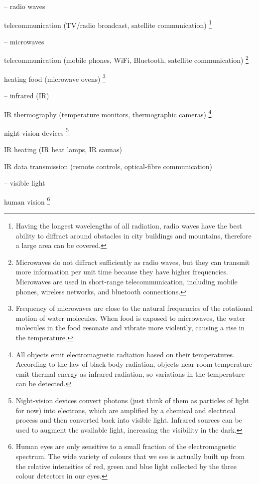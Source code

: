 \begin{compactitem}
	\item[--] radio waves
	
	\xskip telecommunication (TV/radio broadcast, satellite communication) \footnote{Having the longest wavelengths of all radiation, radio waves have the best ability to diffract around obstacles in city buildings and mountains, therefore a large area can be covered.}

	\item[--] microwaves
	
	\xskip telecommunication (mobile phones, WiFi, Bluetooth, satellite communication)
	\footnote{Microwaves do not diffract sufficiently as radio waves, but they can transmit more information per unit time because they have higher frequencies. Microwaves are used in short-range telecommunication, including mobile phones, wireless networks, and bluetooth connections.}
		
		
	\xskip heating food (microwave ovens)
	\footnote{Frequency of microwaves are close to the natural frequencies of the rotational motion of water molecules. When food is exposed to microwaves, the water molecules in the food resonate and vibrate more violently, causing a rise in the temperature.}
	
	\item[--] infrared (IR)
	
	\xskip IR thermography (temperature monitors, thermographic cameras)
	\footnote{All objects emit electromagnetic radiation based on their temperatures. According to the law of black-body radiation, objects near room temperature emit thermal energy as infrared radiation, so variations in the temperature can be detected.}
	
	\xskip night-vision devices
	\footnote{Night-vision devices convert photons (just think of them as particles of light for now) into electrons, which are amplified by a chemical and electrical process and then converted back into visible light. Infrared sources can be used to augment the available light, increasing the visibility in the dark.}
	
	\xskip IR heating (IR heat lamps, IR saunas)
	
	
	\xskip IR data transmission (remote controls, optical-fibre communication)
	
	\item[--] visible light
	
	\xskip human vision
	\footnote{Human eyes are only sensitive to a small fraction of the electromagnetic spectrum. The wide variety of colours that we see is actually built up from the relative intensities of red, green and blue light collected by the three colour detectors in our eyes.}
	

\end{compactitem}

